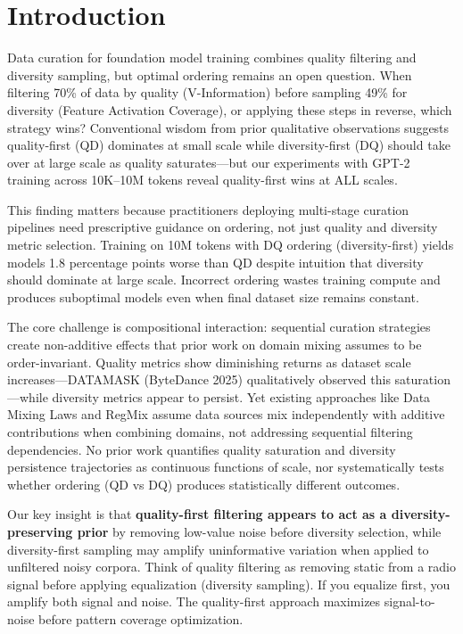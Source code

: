 \section{Introduction}

Data curation for foundation model training combines quality filtering and diversity sampling, but optimal ordering remains an open question. When filtering 70\% of data by quality (V-Information) before sampling 49\% for diversity (Feature Activation Coverage), or applying these steps in reverse, which strategy wins? Conventional wisdom from prior qualitative observations suggests quality-first (QD) dominates at small scale while diversity-first (DQ) should take over at large scale as quality saturates---but our experiments with GPT-2 training across 10K--10M tokens reveal quality-first wins at ALL scales.

This finding matters because practitioners deploying multi-stage curation pipelines need prescriptive guidance on ordering, not just quality and diversity metric selection. Training on 10M tokens with DQ ordering (diversity-first) yields models 1.8 percentage points worse than QD despite intuition that diversity should dominate at large scale. Incorrect ordering wastes training compute and produces suboptimal models even when final dataset size remains constant.

The core challenge is compositional interaction: sequential curation strategies create non-additive effects that prior work on domain mixing assumes to be order-invariant. Quality metrics show diminishing returns as dataset scale increases---DATAMASK (ByteDance 2025) qualitatively observed this saturation---while diversity metrics appear to persist. Yet existing approaches like Data Mixing Laws and RegMix assume data sources mix independently with additive contributions when combining domains, not addressing sequential filtering dependencies. No prior work quantifies quality saturation and diversity persistence trajectories as continuous functions of scale, nor systematically tests whether ordering (QD vs DQ) produces statistically different outcomes.

Our key insight is that \textbf{quality-first filtering appears to act as a diversity-preserving prior} by removing low-value noise before diversity selection, while diversity-first sampling may amplify uninformative variation when applied to unfiltered noisy corpora. Think of quality filtering as removing static from a radio signal before applying equalization (diversity sampling). If you equalize first, you amplify both signal and noise. The quality-first approach maximizes signal-to-noise before pattern coverage optimization.

